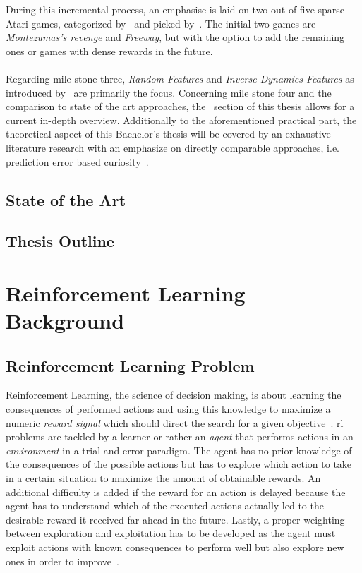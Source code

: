 \documentclass[draft,final]{vutinfth} %
\begin{document}
    During this incremental process, an emphasise is laid on two out of five sparse Atari games, categorized by~\cite{bellemare_unifying_2016} and picked by~\citeauthor{burda_large-scale_2018-1}.
    The initial two games are \textit{Montezumas's revenge} and \textit{Freeway}, but with the option to add the remaining ones or games with dense rewards in the future.
    \\\\
    Regarding mile stone three, \textit{Random Features} and \textit{Inverse Dynamics Features} as introduced by~\citeauthor{burda_large-scale_2018-1} are primarily the focus.
    Concerning mile stone four and the comparison to state of the art approaches, the~ section of this thesis allows for a current in-depth overview.
    Additionally to the aforementioned practical part, the theoretical aspect of this Bachelor's thesis will be covered by an exhaustive literature research with an emphasize on directly comparable approaches, i.e. prediction error based curiosity~\citep{burda_large-scale_2018-1}.


    \section{State of the Art}\label{sec:state-of-the-art}


    \section{Thesis Outline}\label{sec:thesis-outline}


    \chapter{Reinforcement Learning Background}\label{ch:reinforcement-learning-background}


    \section{Reinforcement Learning Problem}\label{sec:reinforcement-learning-problem}
    Reinforcement Learning, the science of decision making, is about learning the consequences of performed actions and using this knowledge to maximize a numeric \textit{reward signal} which should direct the search for a given objective~\citep{sutton_reinforcement_2018}.
    \gls{rl} problems are tackled by a learner or rather an \textit{agent} that performs actions in an \textit{environment} in a trial and error paradigm.
    The agent has no prior knowledge of the consequences of the possible actions but has to explore which action to take in a certain situation to maximize the amount of obtainable rewards.
    An additional difficulty is added if the reward for an action is delayed because the agent has to understand which of the executed actions actually led to the desirable reward it received far ahead in the future.
    Lastly, a proper weighting between exploration and exploitation has to be developed as the agent must exploit actions with known consequences to perform well but also explore new ones in order to improve~\citep{kaelbling_reinforcement_1996}.
\end{document}
